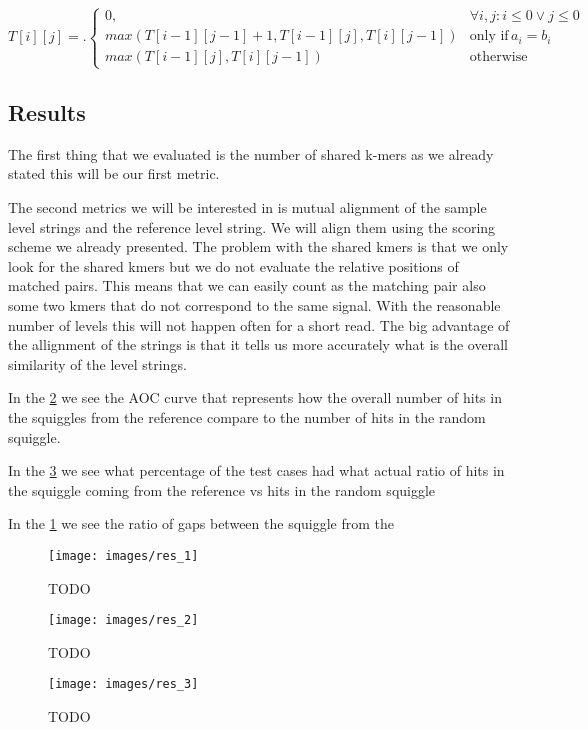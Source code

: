 \[
T[i][j] = \bigl.
  \begin{cases}
    0, & \forall i,j : i\leq 0 \lor j\leq 0 \\
    max(T[i-1][j-1] + 1, T[i-1][j], T[i][j-1]) & \text{only if} \, a_i = b_i \\ 
    max(T[i-1][j], T[i][j-1]) & \text{otherwise}
  \end{cases}
\]

\subsection{Results}

The first thing that we evaluated is the number of shared k-mers as we already
stated this will be our first metric.

The second metrics we will be interested in is mutual alignment of the sample
level strings and the reference level string. We will align them using the scoring
scheme we already presented. The problem with the shared kmers is that we only look
for the shared kmers but we do not evaluate the relative positions of matched pairs.
This means that we can easily count as the matching pair also some two kmers that
do not correspond to the same signal. With the reasonable number of levels this will
not happen often for a short read. The big advantage of the allignment of the strings
is that it tells us more accurately what is the overall similarity of the level strings.

In the \ref{obr:res_2} we see the AOC curve that represents how the overall number
of hits in the squiggles from the reference compare to the number of hits in the
random squiggle.

In the \ref{obr:res_3} we see what percentage of the test cases had what actual
ratio of hits in the squiggle coming from the reference vs hits in the random squiggle 

In the \ref{obr:res_1} we see the ratio of gaps between the squiggle from the 

\begin{figure}
\centerline{\texttt{[image: images/res\_1]}}
\caption[TODO]{TODO}
\label{obr:res_1}
\end{figure}

\begin{figure}
\centerline{\texttt{[image: images/res\_2]}}
\caption[TODO]{TODO}
\label{obr:res_2}
\end{figure}

\begin{figure}
\centerline{\texttt{[image: images/res\_3]}}
\caption[TODO]{TODO}
\label{obr:res_3}
\end{figure}
